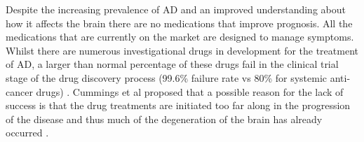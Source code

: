 \documentclass[12pt]{article}
\begin{document}
\par
Despite the increasing prevalence of AD and an improved understanding about how it affects the brain there are no medications that improve prognosis. All the medications that are currently on the market are designed to manage symptoms. Whilst there are numerous investigational drugs in development for the treatment of AD, a larger than normal percentage of these drugs fail in the clinical trial stage of the drug discovery process (99.6\% failure rate vs 80\% for systemic anti-cancer drugs) \cite{Cummings2014}. Cummings et al proposed that a possible reason for the lack of success is that the drug treatments are initiated too far along in the progression of the disease and thus much of the degeneration of the brain has already occurred \cite{Cummings2014}. 
\par 
\end{document}
